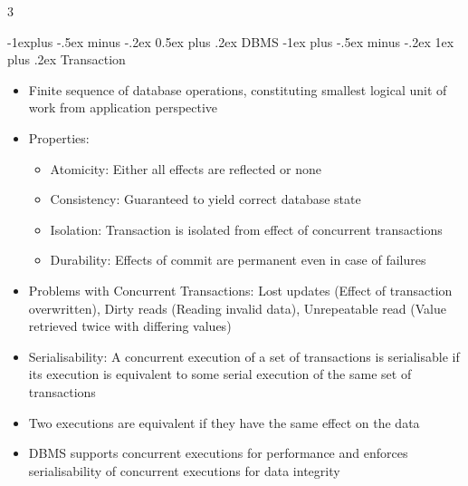 \documentclass[10pt, landscape]{article}
\makeatletter
\renewcommand{\section}{\@startsection{section}{1}{0mm}%
                                {-1ex plus -.5ex minus -.2ex}%
                                {0.5ex plus .2ex}%
                                {\normalfont\large\bfseries}}
\renewcommand{\section}{\@startsection{section}{2}{0mm}%
                                {-1explus -.5ex minus -.2ex}%
                                {0.5ex plus .2ex}%
                                {\normalfont\normalsize\bfseries}}
\renewcommand{\subsection}{\@startsection{subsection}{3}{0mm}%
                                {-1ex plus -.5ex minus -.2ex}%
                                {1ex plus .2ex}%
                                {\normalfont\small\bfseries}}%
\makeatother
\begin{document}
\raggedright
\footnotesize
\begin{multicols*}{3}

\setlength{\columnseprule}{0.25pt}
\setlength{\premulticols}{1pt}
\setlength{\postmulticols}{1pt}
\setlength{\multicolsep}{1pt}
\setlength{\columnsep}{2pt}

\begin{center}
\end{center}

\section{DBMS}
\subsection{Transaction}
\begin{itemize}
    \item Finite sequence of database operations, constituting smallest logical unit of work from application perspective
    \item Properties:
    \begin{itemize}
        \item Atomicity: Either all effects are reflected or none
        \item Consistency: Guaranteed to yield correct database state
        \item Isolation: Transaction is isolated from effect of concurrent transactions
        \item Durability: Effects of commit are permanent even in case of failures
    \end{itemize}
    \item Problems with Concurrent Transactions: Lost updates (Effect of transaction overwritten), Dirty reads (Reading invalid data), Unrepeatable read (Value retrieved twice with differing values)
    \item Serialisability: A concurrent execution of a set of transactions is serialisable if its execution is equivalent to some serial execution of the same set of transactions
    \item Two executions are equivalent if they have the same effect on the data
    \item DBMS supports concurrent executions for performance and enforces serialisability of concurrent executions for data integrity
\end{itemize}


\end{multicols*}
\end{document}

